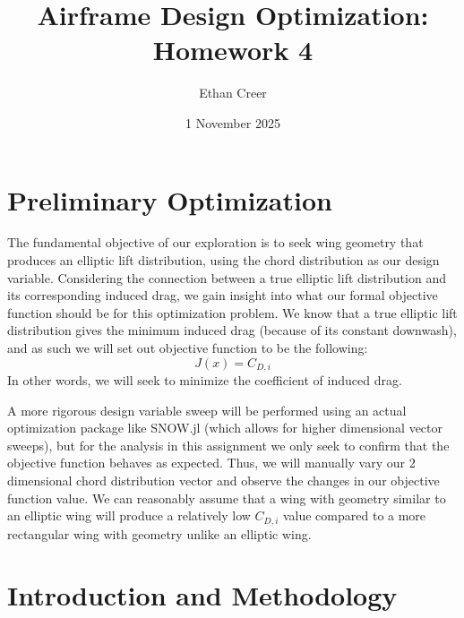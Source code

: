 \documentclass{article}
\title{Airframe Design Optimization: Homework 4}
\author{Ethan Creer}
\date{1 November 2025}
\begin{document}
\maketitle
\section{Preliminary Optimization}
The fundamental objective of our exploration is to seek wing geometry that produces an elliptic lift distribution, using the chord distribution as our design variable.
Considering the connection between a true elliptic lift distribution and its corresponding induced drag, we gain insight into what our formal objective function should be for this optimization problem.
We know that a true elliptic lift distribution gives the minimum induced drag (because of its constant downwash), and as such we will set out objective function to be the following:
\begin{equation}\label{eq:objectiveFunction}
    J(x) = C_{D,i}
\end{equation}
In other words, we will seek to minimize the coefficient of induced drag.

A more rigorous design variable sweep will be performed using an actual optimization package like SNOW.jl (which allows for higher dimensional vector sweeps), but for the analysis in this assignment we only seek to confirm that the objective function behaves as expected.
Thus, we will manually vary our 2 dimensional chord distribution vector and observe the changes in our objective function value.
We can reasonably assume that a wing with geometry similar to an elliptic wing will produce a relatively low $C_{D,i}$ value compared to a more rectangular wing with geometry unlike an elliptic wing.







\section{Introduction and Methodology}
\end{document}

